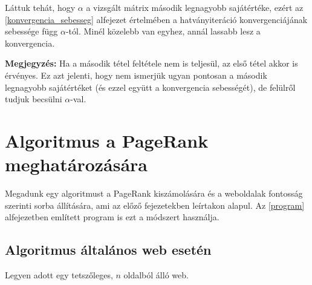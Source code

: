 \documentclass[12pt,a4paper]{article}
\begin{document}
Láttuk tehát, hogy $\alpha$ a vizsgált mátrix második legnagyobb sajátértéke, ezért az \ref{konvergencia_sebesseg} alfejezet értelmében a hatványiteráció konvergenciájának sebessége függ $\alpha$-tól. Minél közelebb van egyhez, annál lassabb lesz a konvergencia.

\vspace{0.2cm}\textbf{Megjegyzés:} Ha a második tétel feltétele nem is teljesül, az első tétel akkor is érvényes. Ez azt jelenti, hogy nem ismerjük ugyan pontosan a második legnagyobb sajátértéket (és ezzel együtt a konvergencia sebességét), de felülről tudjuk becsülni $\alpha$-val.

\section{Algoritmus a PageRank meghatározására}

Megadunk egy algoritmust a PageRank kiszámolására és a weboldalak fontosság szerinti sorba állítására, ami az előző fejezetekben leírtakon alapul. Az \ref{program} alfejezetben említett program is ezt a módszert használja.

\subsection{Algoritmus általános web esetén}

Legyen adott egy tetszőleges, $n$ oldalból álló web.
\end{document}

